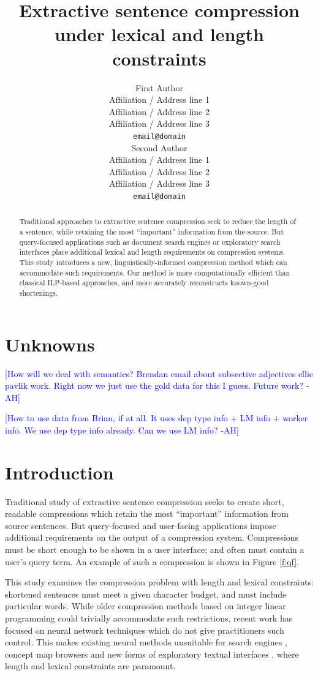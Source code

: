 \documentclass[11pt,a4paper]{article}
\title{Extractive sentence compression under lexical and length constraints}
\author{First Author \\
  Affiliation / Address line 1 \\
  Affiliation / Address line 2 \\
  Affiliation / Address line 3 \\
  {\tt email@domain} \\\And
  Second Author \\
  Affiliation / Address line 1 \\
  Affiliation / Address line 2 \\
  Affiliation / Address line 3 \\
  {\tt email@domain} \\}
\date{}
\newcommand{\ahcomment}[1]{\textcolor{blue}{[#1 -AH]}}
\begin{document}
\maketitle

\begin{abstract}
Traditional approaches to extractive sentence compression seek to reduce the length of a sentence, while retaining the most ``important'' information from the source. But query-focused applications such as document search engines or exploratory search interfaces place additional lexical and length requirements on compression systems. This study introduces a new, linguistically-informed compression method which can accommodate such requirements.  Our method is more computationally efficient than classical ILP-based approaches, and more accurately reconstructs known-good shortenings.
\end{abstract}

\section{Unknowns}

\ahcomment{How will we deal with semantics? Brendan email about subsective adjectives ellie pavlik work. Right now we just use the gold data for this I guess. Future work?}

\ahcomment{How to use data from Brian, if at all. It uses dep type info + LM info + worker info. We use dep type info already. Can we use LM info?}

\section{Introduction}

Traditional study of extractive sentence compression seeks to create short, readable compressions which retain the most ``important'' information from source sentences. But query-focused and user-facing applications impose additional requirements on the output of a compression system. Compressions must be short enough to be shown in a user interface; and often must contain a user's query term. An example of such a compression is shown in Figure \ref{f:qf}.

This study examines the compression problem with length and lexical constraints: shortened sentences must meet a given character budget, and must include particular words. While older compression methods based on integer linear programming could trivially accommodate such restrictions, recent work has focused on neural network techniques \cite{filippova2015sentence} which do not give practitioners such control. This makes existing neural methods unsuitable for search engines \cite{hearst2009search}, concept map browsers \cite{falke2017graphdocexplore} and new forms of exploratory textual interfaces \cite{marchionini2006exploratory}, where length and lexical constraints are paramount. 
\end{document}

